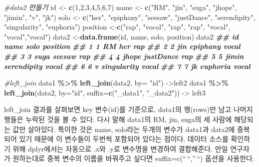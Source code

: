 \documentclass[
]{book}
\newenvironment{Shaded}{\begin{snugshade}}{\end{snugshade}}
\newcommand{\AttributeTok}[1]{\textcolor[rgb]{0.13,0.29,0.53}{#1}}
\newcommand{\CommentTok}[1]{\textcolor[rgb]{0.56,0.35,0.01}{\textit{#1}}}
\newcommand{\DecValTok}[1]{\textcolor[rgb]{0.00,0.00,0.81}{#1}}
\newcommand{\DocumentationTok}[1]{\textcolor[rgb]{0.56,0.35,0.01}{\textbf{\textit{#1}}}}
\newcommand{\FunctionTok}[1]{\textcolor[rgb]{0.13,0.29,0.53}{\textbf{#1}}}
\newcommand{\NormalTok}[1]{#1}
\newcommand{\OtherTok}[1]{\textcolor[rgb]{0.56,0.35,0.01}{#1}}
\newcommand{\SpecialCharTok}[1]{\textcolor[rgb]{0.81,0.36,0.00}{\textbf{#1}}}
\newcommand{\StringTok}[1]{\textcolor[rgb]{0.31,0.60,0.02}{#1}}
\begin{document}
\begin{Shaded}
\begin{Highlighting}[]
\CommentTok{\#data2 만들기}
\NormalTok{id }\OtherTok{\textless{}{-}} \FunctionTok{c}\NormalTok{(}\DecValTok{1}\NormalTok{,}\DecValTok{2}\NormalTok{,}\DecValTok{3}\NormalTok{,}\DecValTok{4}\NormalTok{,}\DecValTok{5}\NormalTok{,}\DecValTok{6}\NormalTok{,}\DecValTok{7}\NormalTok{)}
\NormalTok{name }\OtherTok{\textless{}{-}} \FunctionTok{c}\NormalTok{(}\StringTok{"RM"}\NormalTok{, }\StringTok{"jin"}\NormalTok{, }\StringTok{"suga"}\NormalTok{, }\StringTok{"jhope"}\NormalTok{, }\StringTok{"jimin"}\NormalTok{, }\StringTok{"v"}\NormalTok{, }\StringTok{"jk"}\NormalTok{)}
\NormalTok{solo }\OtherTok{\textless{}{-}} \FunctionTok{c}\NormalTok{(}\StringTok{"her"}\NormalTok{, }\StringTok{"epiphany"}\NormalTok{, }\StringTok{"seesaw"}\NormalTok{, }\StringTok{"justDance"}\NormalTok{, }\StringTok{"serendipity"}\NormalTok{, }\StringTok{"singularity"}\NormalTok{, }\StringTok{"euphoria"}\NormalTok{)}
\NormalTok{position }\OtherTok{\textless{}{-}}\FunctionTok{c}\NormalTok{(}\StringTok{"rap"}\NormalTok{, }\StringTok{"vocal"}\NormalTok{, }\StringTok{"rap"}\NormalTok{, }\StringTok{"rap"}\NormalTok{, }\StringTok{"vocal"}\NormalTok{, }\StringTok{"vocal"}\NormalTok{,}\StringTok{"vocal"}\NormalTok{)}
\NormalTok{data2 }\OtherTok{\textless{}{-}}\FunctionTok{data.frame}\NormalTok{(id, name, solo, position)}
\NormalTok{data2}
\DocumentationTok{\#\#   id  name        solo position}
\DocumentationTok{\#\# 1  1    RM         her      rap}
\DocumentationTok{\#\# 2  2   jin    epiphany    vocal}
\DocumentationTok{\#\# 3  3  suga      seesaw      rap}
\DocumentationTok{\#\# 4  4 jhope   justDance      rap}
\DocumentationTok{\#\# 5  5 jimin serendipity    vocal}
\DocumentationTok{\#\# 6  6     v singularity    vocal}
\DocumentationTok{\#\# 7  7    jk    euphoria    vocal}

\CommentTok{\#left\_join}
\NormalTok{data1 }\SpecialCharTok{\%\textgreater{}\%} 
  \FunctionTok{left\_join}\NormalTok{(data2, }\AttributeTok{by=} \StringTok{"id"}\NormalTok{) }\OtherTok{{-}\textgreater{}}\NormalTok{left2}
\NormalTok{data1 }\SpecialCharTok{\%\textgreater{}\%} 
  \FunctionTok{left\_join}\NormalTok{(data2, }\AttributeTok{by=}\StringTok{"id"}\NormalTok{, }\AttributeTok{suffix=}\FunctionTok{c}\NormalTok{(}\StringTok{"\_data1"}\NormalTok{, }\StringTok{"\_data2"}\NormalTok{)) }\OtherTok{{-}\textgreater{}}\NormalTok{ left3}
\end{Highlighting}
\end{Shaded}

left\_join 결과를 살펴보면 key 변수(id)를 기준으로, data1의 행(rows)만 남고 나머지 행들은 누락된 것을 볼 수 있다. 다시 말해 data1의 RM, jin, suga의 세 사람에 해당되는 값만 살아있다. 특이한 것은 name, solo라는 두개의 변수가 data1과 data2에 중복되어 있기 때문에 이 변수들이 두번씩 포함되어 있다는 점이다. 데이터 소스를 확인하기 위해 dplyr에서는 자동으로 .x와 .y로 변수명을 변경하여 결합해준다. 만일 연구자가 원하는대로 중복 변수의 이름을 바꿔주고 싶다면 suffix=c(``\,``,''\,``) 옵션을 사용한다.
\end{document}
